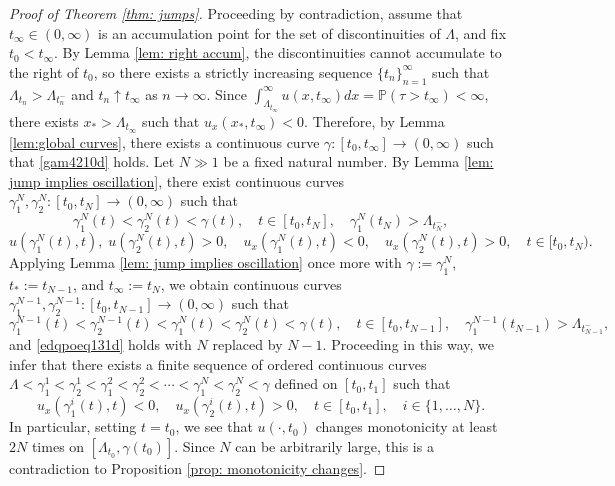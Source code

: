 \documentclass{article}
\numberwithin{equation}{section}
\numberwithin{figure}{section}
\theoremstyle{plain}
\theoremstyle{plain}
\theoremstyle{plain}
\theoremstyle{plain}
\theoremstyle{definition}
\theoremstyle{remark}
\def\P{{\mathbb{P}}}
\begin{document}
\begin{proof}[Proof of Theorem \ref{thm: jumps}]Proceeding by contradiction, assume that $t_{\infty}\in (0,\infty)$ is an accumulation point for the set of discontinuities of $\Lambda$, and fix $t_0<t_{\infty}$. By Lemma \ref{lem: right accum}, the discontinuities cannot accumulate to the right of $t_0$, so there exists a strictly increasing sequence $\{t_n\}_{n=1}^{\infty}$ such that $\Lambda_{t_n}>\Lambda_{t_n^-}$ and $t_n \uparrow t_{\infty}$ as $n\to \infty$. Since $\int_{\Lambda_{t_{\infty}}}^{\infty}u(x,t_{\infty})dx=\P(\tau>t_{\infty})<\infty$, there exists $x_*>\Lambda_{t_{\infty}}$ such that $u_x(x_*,t_{\infty})<0$. Therefore, by Lemma \ref{lem:global curves}, there exists a continuous curve $\gamma:[t_0,t_{\infty}] \to (0,\infty) $ such that \eqref{gam4210d} holds. Let $N\gg1$ be a fixed natural number. By Lemma \ref{lem: jump implies oscillation}, there exist continuous curves $\gamma_1^N,\gamma_2^N:[t_0,t_N] \to (0,\infty)$ such that
\begin{equation}
    \gamma_1^N(t)<\gamma^N_2(t)<\gamma(t), \quad  t\in[t_0,t_N], \quad  \gamma_1^N(t_N)>\Lambda_{t_N^-},
\end{equation}
\begin{equation} \label{edqpoeq131d}
  u(\gamma_1^N(t),t),\;u(\gamma_2^N(t),t)>0, \quad u_x(\gamma_1^N(t),t)<0, \quad u_x(\gamma_2^N(t),t)>0, \quad t\in[t_0,t_N).
\end{equation}
Applying Lemma \ref{lem: jump implies oscillation} once more with $\gamma:=\gamma_1^N$, $t_*:=t_{N-1}$, and $t_{\infty}:=t_N$, we obtain continuous curves $\gamma_{1}^{N-1}, \gamma_{2}^{N-1}:[t_0,t_{N-1}]\to (0,\infty)$ such that
\begin{equation}
    \gamma_{1}^{N-1}(t)<\gamma_2^{N-1}(t)<\gamma_1^N(t)<\gamma^N_2(t)<\gamma(t), \quad  t\in[t_0,t_{{N-1}}], \quad\gamma_1^{N-1}(t_{N-1})>\Lambda_{t_{N-1}^-},
\end{equation}
and \eqref{edqpoeq131d} holds with $N$ replaced by $N-1$.
Proceeding in this way, we infer that there exists a finite sequence of ordered continuous curves $\Lambda<\gamma_1^1<\gamma_2^1<\gamma_1^2<\gamma_2^2<\cdots <\gamma_1^N<\gamma_2^N<\gamma$ defined on $[t_0,t_1]$ such that 
\[u_x(\gamma_{1}^i(t),t)<0, \quad u_x(\gamma_2^i(t),t)>0,\quad t\in [t_0,t_1], \quad i\in \{1,\ldots,N\}. \]
In particular, setting $t=t_0$, we see that $u(\cdot,t_0)$ changes monotonicity at least $2N$ times on $[\Lambda_{t_0},\gamma(t_0)]$. Since $N$ can be arbitrarily large, this is a contradiction to Proposition \ref{prop: monotonicity changes}.
\end{proof}
\end{document}
